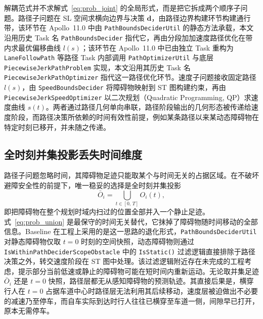 \documentclass[a4paper,11pt]{ctexart}
\theoremstyle{definition}
\begin{document}
解耦范式并不求解式~\eqref{eq:prob_joint} 的全局形式，而是把它拆成两个顺序子问题。路径子问题在 SL 空间求横向边界与决策 $\mathbf{d}$，由路径边界构建环节构建通行带，该环节在 Apollo~11.0 中由 \texttt{PathBoundsDeciderUtil} 的静态方法承载，本文沿用历史 Task 名 \texttt{PathBoundsDecider} 指代它，再由分段加加速度路径优化在带内求最优偏移曲线 $l(s)$；该环节在 Apollo~11.0 中已由独立 Task 重构为 \texttt{LaneFollowPath} 等路径 Task 内部调用 \texttt{PathOptimizerUtil} 与底层 \texttt{PiecewiseJerkPathProblem} 实现，本文沿用其历史 Task 名 \texttt{PiecewiseJerkPathOptimizer} 指代这一路径优化环节。速度子问题接收固定路径 $l(s)$，由 \texttt{SpeedBoundsDecider} 将障碍物映射到 ST 图构建约束，再由 \texttt{PiecewiseJerkSpeedOptimizer} 以二次规划（Quadratic Programming, QP）求速度曲线 $s(t)$。两者通过路径几何单向串联，路径阶段输出的几何形态被传递给速度阶段，而路径决策所依赖的时间有效性前提，例如某条路径以来某动态障碍物在特定时刻已移开，并未随之传递。

\subsection{全时刻并集投影丢失时间维度}
\label{subsec:union_projection}

路径子问题忽略时间，其障碍物足迹只能取某个与时间无关的占据区域。在不破坏避障安全性的前提下，唯一稳妥的选择是全时刻并集投影
\begin{equation}
    \bar{O}_i = \bigcup_{t \in [0,\,T]} O_i(t),
    \label{eq:prob_union}
\end{equation}
即把障碍物在整个规划时域内扫过的位置全部并入一个静止足迹。式~\eqref{eq:prob_union} 是最保守的时间无关替代，它抹掉了障碍物随时间移动的全部信息。Baseline 在工程上采用的是这一思路的退化形式，\texttt{PathBoundsDeciderUtil} 对静态障碍物仅取 $t{=}0$ 时刻的空间快照，动态障碍物则通过 \texttt{IsWithinPathDeciderScopeObstacle} 中的 \texttt{IsStatic()} 过滤逻辑直接排除于路径决策之外，转交速度阶段在 ST 图中处理。该过滤逻辑附近存在未完成的工程考虑，提示部分当前低速或静止的障碍物可能在短时间内重新运动。无论取并集足迹 $\bar{O}_i$ 还是 $t{=}0$ 快照，路径层都无从感知障碍物的预测轨迹。其直接后果是，横穿行人在 $t{=}0$ 占据车道中心时路径层无法利用其后续移动，速度层被迫做出不必要的减速乃至停车，而自车实际到达时行人往往已横穿至车道一侧，间隙早已打开，原本无需停车。
\end{document}
